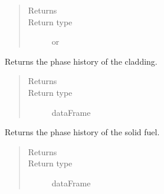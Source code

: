 \documentclass[letterpaper,10pt,openany,oneside,english]{sphinxmanual}
\begin{document}
\begin{fulllineitems}
\begin{fulllineitems}
\begin{quote}
\begin{description}
\begin{itemize}
\end{itemize}

\item[{Returns}] \leavevmode
{}

\item[{Return type}] \leavevmode
{} or 

\end{description}\end{quote}

\end{fulllineitems}


\begin{fulllineitems}
\label{\detokenize{support_rst/fuelslug:fuelslug.FuelSlug.GetCladdingPhase}}
Returns the phase history of the cladding.
\begin{quote}\begin{description}
\item[{Returns}] \leavevmode
{}

\item[{Return type}] \leavevmode
dataFrame

\end{description}\end{quote}

\end{fulllineitems}


\begin{fulllineitems}
\label{\detokenize{support_rst/fuelslug:fuelslug.FuelSlug.GetFuelPhase}}
Returns the phase history of the solid fuel.
\begin{quote}\begin{description}
\item[{Returns}] \leavevmode
{}

\item[{Return type}] \leavevmode
dataFrame

\end{description}\end{quote}


\end{fulllineitems}
\end{fulllineitems}
\end{document}
